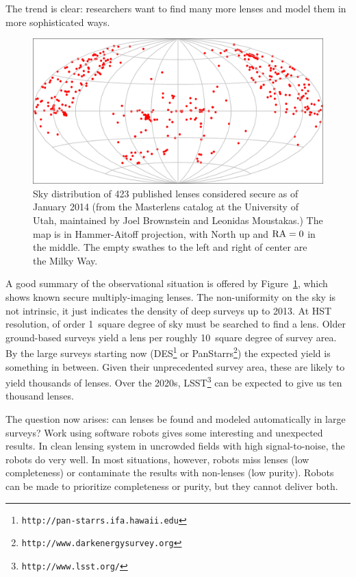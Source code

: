 \documentclass[12pt,preprint]{aastex}
\begin{document}
The trend is clear: researchers want to find many more lenses and
model them in more sophisticated ways.

\begin{figure}[h]
\centering
\includegraphics[width=.7\hsize]{fig/lenssky}
\caption{Sky distribution of 423 published lenses considered secure as
  of January 2014 (from the Masterlens catalog at the University of
  Utah, maintained by Joel Brownstein and Leonidas Moustakas.) The map
  is in Hammer-Aitoff projection, with North up and $\rm RA=0$ in the
  middle.  The empty swathes to the left and right of center are the
  Milky Way.}
\label{fig:masterlens}
\end{figure}

A good summary of the observational situation is offered by
Figure~\ref{fig:masterlens}, which shows known secure multiply-imaging
lenses.  The non-uniformity on the sky is not intrinsic, it just
indicates the density of deep surveys up to 2013.  At HST resolution,
of order 1~square degree of sky must be searched to find a lens.
Older ground-based surveys yield a lens per roughly 10~square degree
of survey area.  By the large surveys starting now
(DES\footnote{\tt http://pan-starrs.ifa.hawaii.edu} or
PanStarrs\footnote{\tt http://www.darkenergysurvey.org}) the expected
yield is something in between.  Given their unprecedented survey area,
these are likely to yield thousands of lenses.  Over the 2020s,
LSST\footnote{\tt http://www.lsst.org/} can be expected to give us ten
thousand lenses.

The question now arises: can lenses be found and modeled
automatically in large surveys?  Work using software robots
\citep{2009ApJ...694..924M} gives some interesting and unexpected
results.  In clean lensing system in uncrowded fields with high
signal-to-noise, the robots do very well.  In most situations,
however, robots miss lenses (low completeness) or contaminate the
results with non-lenses (low purity).  Robots can be made to
prioritize completeness or purity, but they cannot deliver both.
\end{document}
